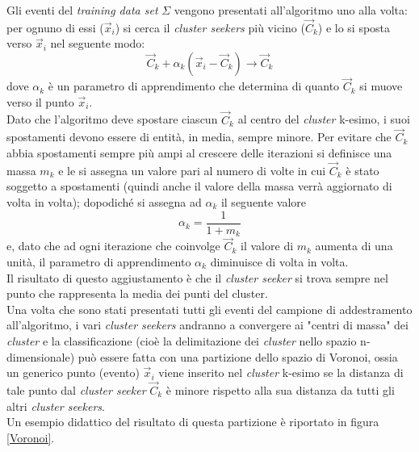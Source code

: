 Gli eventi del \textit{training data set} $\Sigma$ vengono presentati all'algoritmo uno alla volta: per ognuno di essi ($\vec{x}_i$) si cerca il \textit{cluster seekers} più vicino ($\vec{C}_k$) e lo si sposta verso $\vec{x}_i$ nel seguente modo:
\begin{equation}
\vec{C}_k + \alpha_k(\vec{x}_i - \vec{C}_k) \rightarrow \vec{C}_k
\end{equation}
dove $\alpha_k$ è un parametro di apprendimento che determina di quanto $\vec{C}_k$ si muove verso il punto $\vec{x}_i$. \\
Dato che l'algoritmo deve spostare ciascun $\vec{C}_k$ al centro del \textit{cluster} k-esimo, i suoi spostamenti devono essere di entità, in media, sempre minore. Per evitare che $\vec{C}_k$ abbia spostamenti sempre più ampi al crescere delle iterazioni si definisce una massa $m_k$ e le si assegna un valore pari al numero di volte in cui $\vec{C}_k$ è stato soggetto a spostamenti (quindi anche il valore della massa verrà aggiornato di volta in volta); dopodiché si assegna ad $\alpha_k$ il seguente valore
\begin{equation}
\alpha_k = \frac{1}{1 + m_k}
\end{equation} 
e, dato che ad ogni iterazione che coinvolge $\vec{C}_k$ il valore di $m_k$ aumenta di una unità, il parametro di apprendimento $\alpha_k$ diminuisce di volta in volta. \\
Il risultato di questo aggiustamento è che il \textit{cluster seeker} si trova sempre nel punto che rappresenta la media dei punti del cluster. \\
Una volta che sono stati presentati tutti gli eventi del campione di addestramento all'algoritmo, i vari \textit{cluster seekers} andranno a convergere ai "centri di massa" dei \textit{cluster} e la classificazione (cioè la delimitazione dei \textit{cluster} nello spazio n-dimensionale) può essere fatta con una partizione dello spazio di Voronoi, ossia un generico punto (evento) $\vec{x}_i$ viene inserito nel \textit{cluster} k-esimo se la distanza di tale punto dal \textit{cluster seeker} $\vec{C}_k$ è minore rispetto alla sua distanza da tutti gli altri \textit{cluster seekers}. \\
Un esempio didattico del risultato di questa partizione è riportato in figura \ref{Voronoi}.

\newpage

